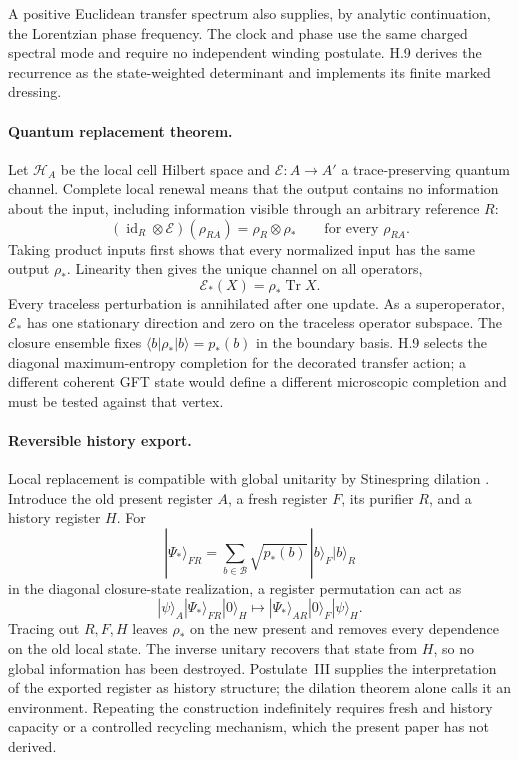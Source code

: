 \documentclass[11pt]{article}
\begin{document}
A positive Euclidean transfer spectrum also supplies, by analytic continuation, the Lorentzian phase frequency. The clock and phase use the same charged spectral mode and require no independent winding postulate. H.9 derives the recurrence as the state-weighted determinant and implements its finite marked dressing.

\paragraph{Quantum replacement theorem.}
Let $\mathcal H_A$ be the local cell Hilbert space and $\mathcal E:A\to A'$ a trace-preserving quantum channel. Complete local renewal means that the output contains no information about the input, including information visible through an arbitrary reference $R$:
\[
(\operatorname{id}_R\otimes\mathcal E)(\rho_{RA})
=
\rho_R\otimes\rho_*
\qquad
\text{for every }\rho_{RA}.
\]
Taking product inputs first shows that every normalized input has the same output $\rho_*$. Linearity then gives the unique channel on all operators,
\[
\boxed{\mathcal E_*(X)=\rho_*\operatorname{Tr}X}.
\]
Every traceless perturbation is annihilated after one update. As a superoperator, $\mathcal E_*$ has one stationary direction and zero on the traceless operator subspace. The closure ensemble fixes $\langle b|\rho_*|b\rangle=p_*(b)$ in the boundary basis. H.9 selects the diagonal maximum-entropy completion for the decorated transfer action; a different coherent GFT state would define a different microscopic completion and must be tested against that vertex.

\paragraph{Reversible history export.}
Local replacement is compatible with global unitarity by Stinespring dilation \citep{Stinespring1955}. Introduce the old present register $A$, a fresh register $F$, its purifier $R$, and a history register $H$. For
\[
|\Psi_*\rangle_{FR}
=
\sum_{b\in\mathcal B}\sqrt{p_*(b)}\,|b\rangle_F|b\rangle_R
\]
in the diagonal closure-state realization, a register permutation can act as
\[
|\psi\rangle_A|\Psi_*\rangle_{FR}|0\rangle_H
\longmapsto
|\Psi_*\rangle_{AR}|0\rangle_F|\psi\rangle_H.
\]
Tracing out $R,F,H$ leaves $\rho_*$ on the new present and removes every dependence on the old local state. The inverse unitary recovers that state from $H$, so no global information has been destroyed. Postulate~III supplies the interpretation of the exported register as history structure; the dilation theorem alone calls it an environment. Repeating the construction indefinitely requires fresh and history capacity or a controlled recycling mechanism, which the present paper has not derived.
\end{document}
